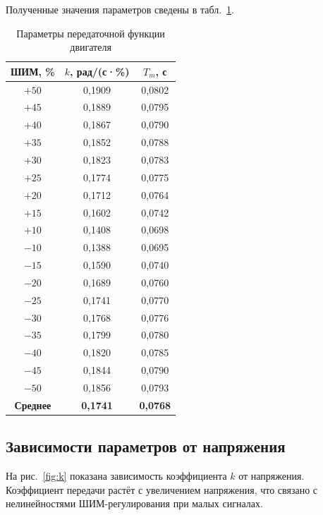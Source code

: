 \documentclass[a4paper, 12pt]{article}
\begin{document}
Полученные значения параметров сведены в табл.~\ref{tab:params}.

\begin{table}[H]
    \centering
    \caption{Параметры передаточной функции двигателя}
    \label{tab:params}
    \begin{tabular}{|c|c|c|}
        \hline
        \textbf{ШИМ, \%} & \textbf{$k$, рад/(с·\%)} & \textbf{$T_m$, с} \\
        \hline
        $+50$  &  0,1909  &  0,0802 \\
        $+45$  &  0,1889  &  0,0795 \\
        $+40$  &  0,1867  &  0,0790 \\
        $+35$  &  0,1852  &  0,0788 \\
        $+30$  &  0,1823  &  0,0783 \\
        $+25$  &  0,1774  &  0,0775 \\
        $+20$  &  0,1712  &  0,0764 \\
        $+15$  &  0,1602  &  0,0742 \\
        $+10$  &  0,1408  &  0,0698 \\
        \hline
        $-10$  &  0,1388  &  0,0695 \\
        $-15$  &  0,1590  &  0,0740 \\
        $-20$  &  0,1689  &  0,0760 \\
        $-25$  &  0,1741  &  0,0770 \\
        $-30$  &  0,1768  &  0,0776 \\
        $-35$  &  0,1799  &  0,0780 \\
        $-40$  &  0,1820  &  0,0785 \\
        $-45$  &  0,1844  &  0,0790 \\
        $-50$  &  0,1856  &  0,0793 \\
        \hline
        \textbf{Среднее} & \textbf{0,1741} & \textbf{0,0768} \\
        \hline
    \end{tabular}
\end{table}

\subsection{Зависимости параметров от напряжения}

На рис.~\ref{fig:k} показана зависимость коэффициента $k$ от напряжения. Коэффициент передачи растёт с увеличением напряжения, что связано с нелинейностями ШИМ-регулирования при малых сигналах.
\end{document}
